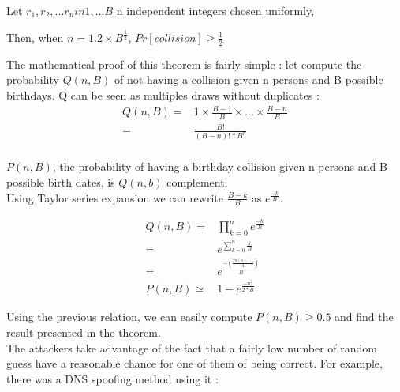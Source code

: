 \begin{mytheorem}
Let $r_1,r_2,...r_n in {1,...B}$ n independent integers chosen uniformly, \\
\begin{flushright}
Then, when $n = 1.2\times B^{\frac{1}{2}}$, $Pr[collision] \geq \frac{1}{2} $
\end{flushright}
\end{mytheorem}

The mathematical proof of this theorem is fairly simple : let compute the probability $Q(n,B)$ of not having a collision given n persons and B possible birthdays. Q can be seen as multiples draws without duplicates : \\
\begin{align}
    Q(n,B) =& 1 \times \frac{B-1}{B} \times ... \times \frac{B-n}{B} \\
           =& \frac{B!}{(B-n)!*B^n} \\
\end{align}  

$P(n,B)$, the probability of having a birthday collision given n persons and B possible birth dates, is $Q(n,b)$ complement. \\
Using Taylor series expansion we can rewrite $\frac{B-k}{B}$ as $e^{\frac{-k}{B}}$. 

\begin{align}
    Q(n,B) =& \prod_{k = 0}^n e^{\frac{-k}{B}}      \\
           =& e^{\sum_{k = 0}^n \frac{k}{B}}        \\
           =& e^{ \frac{-(\frac{*n(n-1)}{2})}{B} }  \\
    P(n,B) \simeq& 1 - e^{ \frac{-n^2}{2*B} }       
\end{align}  


Using the previous relation, we can easily compute $P(n,B) \geq 0.5$ and find the result presented in the theorem.\\

The attackers take advantage of the fact that a fairly low number of random guess have a reasonable chance for one of them of being correct. For example, there was a DNS spoofing method using it : \\

